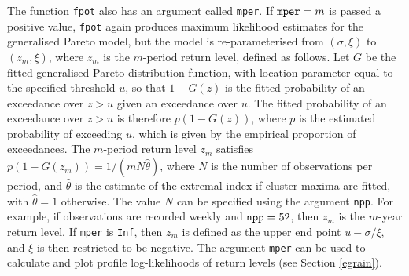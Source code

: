 \documentclass[11pt,a4paper]{article}
\begin{document}
The function \verb+fpot+ also has an argument called \verb+mper+.
If $\verb+mper+ = m$ is passed a positive value, \verb+fpot+ again produces maximum likelihood estimates for the generalised Pareto model, but the model is re-parameterised from $(\sigma,\xi)$ to $(z_m,\xi)$, where $z_m$ is the $m$-period return level, defined as follows. 
Let $G$ be the fitted generalised Pareto distribution function, with location parameter equal to the specified threshold $u$, so that $1 - G(z)$ is the fitted probability of an exceedance over $z > u$ given an exceedance over $u$.
The fitted probability of an exceedance over $z > u$ is therefore $p(1 - G(z))$, where $p$ is the estimated probability of exceeding $u$, which is given by the empirical proportion of exceedances.
The $m$-period return level $z_m$ satisfies $p(1 - G(z_m)) = 1/(mN\hat{\theta})$, where $N$ is the number of observations per period, and $\hat{\theta}$ is the estimate of the extremal index if cluster maxima are fitted, with $\hat{\theta} = 1$ otherwise. The value $N$ can be specified using the argument \verb+npp+. For example, if observations are recorded weekly and $\verb+npp+ = 52$, then $z_m$ is the $m$-year return level.
If \verb+mper+ is \verb+Inf+, then $z_m$ is defined as the upper end point $u - \sigma/\xi$, and $\xi$ is then restricted to be negative.
The argument \verb+mper+ can be used to calculate and plot profile log-likelihoods of return levels (see Section \ref{egrain}).
\end{document}
